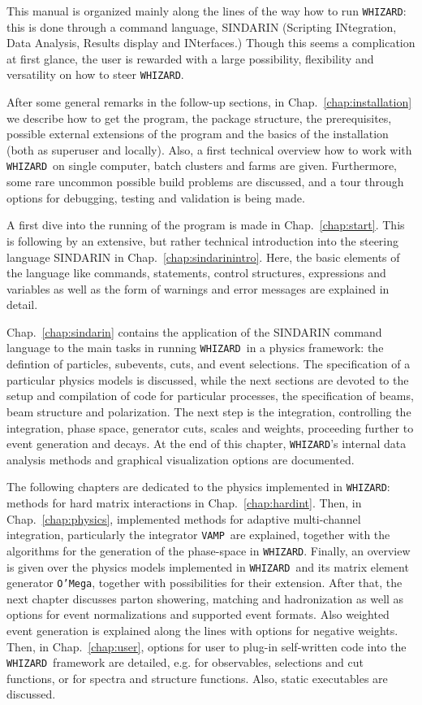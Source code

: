 \documentclass[12pt]{book}
\newcommand{\whizard}{\texttt{WHIZARD}}
\newcommand{\oMega}{\texttt{O'Mega}}
\newcommand{\vamp}{\texttt{VAMP}}
\begin{document}
This manual is organized mainly along the lines of the way how to run
\whizard: this is done through a command language, SINDARIN (Scripting
INtegration, Data Analysis, Results display and INterfaces.) Though
this seems a complication at first glance, the user is rewarded with a
large possibility, flexibility and versatility on how to steer
\whizard. 

After some general remarks in the follow-up sections, in
Chap.~\ref{chap:installation} we describe how to get the program, the
package structure, the prerequisites, possible external extensions of
the program and the basics of the installation (both as superuser and
locally). Also, a first technical overview how to work with \whizard\
on single computer, batch clusters and farms are given. Furthermore,
some rare uncommon possible build problems are discussed, and a tour
through options for debugging, testing and validation is being made. 

A first dive into the running of the program is made in
Chap.~\ref{chap:start}. This is following by an extensive, but rather
technical introduction into the steering language SINDARIN in
Chap.~\ref{chap:sindarinintro}. Here, the basic elements of the
language like commands, statements, control structures, expressions
and variables as well as the form of warnings and error messages are
explained in detail. 

Chap.~\ref{chap:sindarin} contains the application of the SINDARIN
command language to the main tasks in running \whizard\ in a physics
framework: the defintion of particles, subevents, cuts, and event
selections. The specification of a particular physics models is
discussed, while the next sections are devoted to the setup and
compilation of code for particular processes, the specification of
beams, beam structure and polarization. The next step is the
integration, controlling the integration, phase space, generator cuts,
scales and weights, proceeding further to event generation and
decays. At the end of this chapter, \whizard's internal data analysis
methods and graphical visualization options are documented. 

The following chapters are dedicated to the physics implemented in
\whizard: methods for hard matrix interactions in
Chap.~\ref{chap:hardint}. Then, in Chap.~\ref{chap:physics},
implemented methods for adaptive multi-channel integration,
particularly the integrator \vamp\ are explained, together with the
algorithms for the generation of the phase-space in \whizard. Finally,
an overview is given over the physics models implemented in \whizard\
and its matrix element generator \oMega, together with possibilities
for their extension. After that, the next chapter discusses parton
showering, matching and hadronization as well as options for event
normalizations and supported event formats. Also weighted event
generation is explained along the lines with options for negative
weights. Then, in Chap.~\ref{chap:user}, options for user to plug-in
self-written code into the \whizard\ framework are detailed, e.g. for
observables, selections and cut functions, or for spectra and
structure functions. Also, static executables are discussed. 
\end{document}
